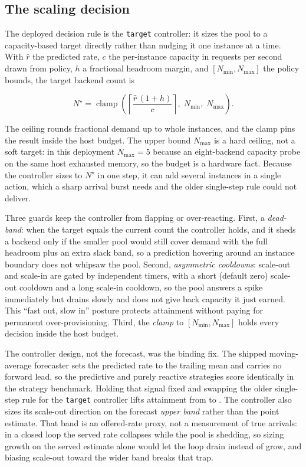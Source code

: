 \subsection{The scaling decision}\label{imb:autoscaler_decision}

The deployed decision rule is the \texttt{target} controller: it sizes the pool
to a capacity-based target directly rather than nudging it one instance at a
time. With $\hat{r}$ the predicted rate, $c$ the per-instance capacity in
requests per second drawn from policy, $h$ a fractional headroom margin, and
$[N_{\min}, N_{\max}]$ the policy bounds, the target backend count is

\begin{equation}\label{imb:eq:scale}
  N^{\star} = \operatorname{clamp}\!\left(
    \left\lceil \frac{\hat{r}\,(1+h)}{c} \right\rceil,
    \; N_{\min}, \; N_{\max}
  \right).
\end{equation}

The ceiling rounds fractional demand up to whole instances, and the clamp pins the
result inside the host budget. The upper bound $N_{\max}$ is a hard ceiling, not a
soft target: in this deployment $N_{\max}=5$ because an eight-backend capacity
probe on the same host exhausted memory, so the budget is a hardware fact. Because
the controller sizes to $N^{\star}$ in one step, it can add several instances in a
single action, which a sharp arrival burst needs and the older single-step rule
could not deliver.

Three guards keep the controller from flapping or over-reacting. First, a
\emph{dead-band}: when the target equals the current count the controller holds,
and it sheds a backend only if the smaller pool would still cover demand with the
full headroom plus an extra slack band, so a prediction hovering around an instance
boundary does not whipsaw the pool. Second, \emph{asymmetric cooldowns}: scale-out
and scale-in are gated by independent timers, with a short (default zero) scale-out
cooldown and a long scale-in cooldown, so the pool answers a spike immediately but
drains slowly and does not give back capacity it just earned. This ``fast out,
slow in'' posture protects attainment without paying for permanent
over-provisioning. Third, the \emph{clamp} to $[N_{\min}, N_{\max}]$ holds every
decision inside the host budget.

The controller design, not the forecast, was the binding fix. The shipped
moving-average forecaster sets the predicted rate to the trailing mean and carries
no forward lead, so the predictive and purely reactive strategies score identically
in the strategy benchmark. Holding that signal fixed and swapping the older
single-step rule for the \texttt{target} controller lifts attainment from
\BMasSlaReactive{} to \BMasSlaTarget{}. The controller also sizes its scale-out
direction on the forecast \emph{upper band} rather than the point estimate. That
band is an offered-rate proxy, not a measurement of true arrivals: in a closed loop
the served rate collapses while the pool is shedding, so sizing growth on the
served estimate alone would let the loop drain instead of grow, and biasing
scale-out toward the wider band breaks that trap.

